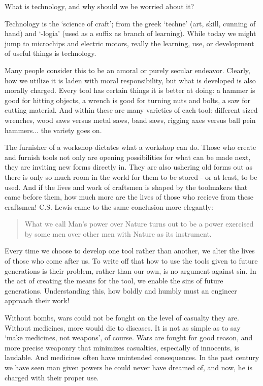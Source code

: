 \documentclass[letterpaper]{article}
\begin{document}
What is technology, and why should we be worried about it?

Technology is the `science of craft'; from the greek `techne' (art, skill, cunning of hand) and `-logia' (used as a suffix as branch of learning). While today we might jump to microchips and electric motors, really the learning, use, or development of useful things is technology.

Many people consider this to be an amoral or purely secular endeavor. Clearly, how we utilize it is laden with moral responsibility, but what is developed is also morally charged. Every tool has certain things it is better at doing: a hammer is good for hitting objects, a wrench is good for turning nuts and bolts, a saw for cutting material. And within these are many varieties of each tool: different sized wrenches, wood saws versus metal saws, band saws, rigging axes versus ball pein hammers... the variety goes on.

The furnisher of a workshop dictates what a workshop can do. Those who create and furnish tools not only are opening possibilities for what can be made next, they are inviting new forms directly in. They are also ushering old forms out as there is only so much room in the world for them to be stored - or at least, to be used. And if the lives and work of craftsmen is shaped by the toolmakers that came before them, how much more are the lives of those who recieve from these craftsmen! C.S. Lewis came to the same conclusion more elegantly:

\begin{quote}
  What we call Man's power over Nature turns out to be a power exercised by some men over other men with Nature as its instrument.
\end{quote}

Every time we choose to develop one tool rather than another, we alter the lives of those who come after us. To write off that how to use the tools given to future generations is their problem, rather than our own, is no argument against sin. In the act of creating the means for the tool, we enable the sins of future generations. Understanding this, how boldly and humbly must an engineer approach their work!

Without bombs, wars could not be fought on the level of casualty they are. Without medicines, more would die to diseases. It is not as simple as to say `make medicines, not weapons', of course. Wars are fought for good reason, and more precise weaponry that minimizes casualties, especially of innocents, is laudable. And medicines often have unintended consequences. In the past century we have seen man given powers he could never have dreamed of, and now, he is charged with their proper use.
\end{document}
